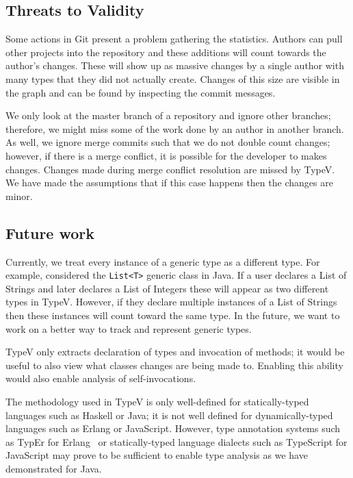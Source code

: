 \subsection{Threats to Validity}

Some actions in Git present a problem gathering the statistics. Authors can pull other projects into the repository and these additions will count towards the author's changes. These will show up as massive changes by a single author with many types that they did not actually create. Changes of this size are visible in the graph and can be found by inspecting the commit messages.

We only look at the master branch of a repository and ignore other branches; therefore, we might miss some of the work done by an author in another branch. As well, we ignore merge commits such that we do not double count changes; however, if there is a merge conflict, it is possible for the developer to makes changes. Changes made during merge conflict resolution are missed by TypeV. We have made the assumptions that if this case happens then the changes are minor.

\subsection{Future work}

Currently, we treat every instance of a generic type as a different type. For example, considered the \texttt{List<T>} generic class in Java. If a user declares a List of Strings and later declares a List of Integers these will appear as two different types in TypeV. However, if they declare multiple instances of a List of Strings then these instances will count toward the same type. In the future, we want to work on a better way to track and represent generic types.

TypeV only extracts declaration of types and invocation of methods; it would be useful to also view what classes changes are being made to. Enabling this ability would also enable analysis of self-invocations.

The methodology used in TypeV is only well-defined for statically-typed languages such as Haskell or Java; it is not well defined for dynamically-typed languages such as Erlang or JavaScript. However, type annotation systems such as TypEr for Erlang~\cite{typer} or statically-typed language dialects such as TypeScript for JavaScript may prove to be sufficient to enable type analysis as we have demonstrated for Java.

